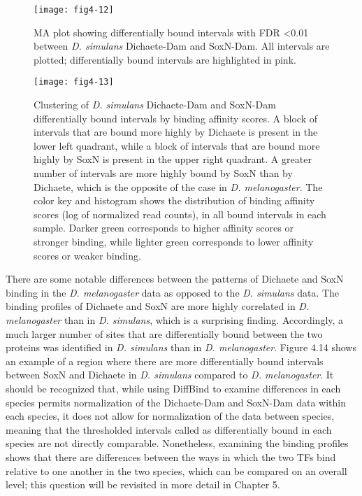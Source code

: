 \begin{figure}
\centering
\texttt{[image: fig4-12]}
\caption{MA plot showing differentially bound intervals with FDR \textless 0.01 between \emph{D. simulans} Dichaete-Dam and SoxN-Dam. All intervals are plotted; differentially bound intervals are highlighted in pink.}
\label{Figure 4.12}
\end{figure}

\begin{figure}
\centering
\texttt{[image: fig4-13]}
\caption{Clustering of \emph{D. simulans} Dichaete-Dam and SoxN-Dam differentially bound intervals by binding affinity scores. A block of intervals that are bound more highly by Dichaete is present in the lower left quadrant, while a block of intervals that are bound more highly by SoxN is present in the upper right quadrant. A greater number of intervals are more highly bound by SoxN than by Dichaete, which is the opposite of the case in \emph{D. melanogaster}. The color key and histogram shows the distribution of binding affinity scores (log of normalized read counts), in all bound intervals in each sample. Darker green corresponds to higher affinity scores or stronger binding, while lighter green corresponds to lower affinity scores or weaker binding.}
\label{Figure 4.13}
\end{figure}

There are some notable differences between the patterns of Dichaete and SoxN binding in the \emph{D. melanogaster} data as opposed to the \emph{D. simulans} data. The binding profiles of Dichaete and SoxN are more highly correlated in \emph{D. melanogaster} than in \emph{D. simulans}, which is a surprising finding. Accordingly, a much larger number of sites that are differentially bound between the two proteins was identified in \emph{D. simulans} than in \emph{D. melanogaster}. Figure 4.14 shows an example of a region where there are more differentially bound intervals between SoxN and Dichaete in \emph{D. simulans} compared to \emph{D. melanogaster}. It should be recognized that, while using DiffBind to examine differences in each species permits normalization of the Dichaete-Dam and SoxN-Dam data within each species, it does not allow for normalization of the data between species, meaning that the thresholded intervals called as differentially bound in each species are not directly comparable. Nonetheless, examining the binding profiles shows that there are differences between the ways in which the two TFs bind relative to one another in the two species, which can be compared on an overall level; this question will be revisited in more detail in Chapter 5.\\

